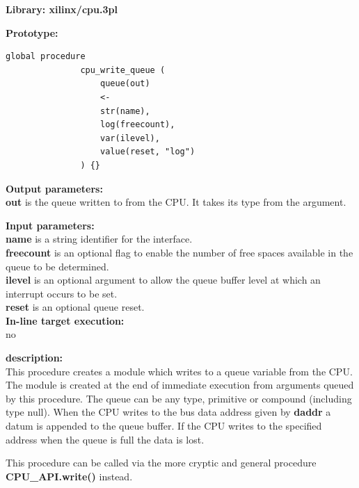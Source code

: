             {\bf Library: xilinx/cpu.3pl}

            {\bf Prototype:} \\
            \vsp
            \begin{lstlisting}[gobble=12, language=threepl]
               global procedure
               cpu_write_queue (
                   queue(out)
                   <-
                   str(name),
                   log(freecount),
                   var(ilevel),
                   value(reset, "log")
               ) {}
            \end{lstlisting}

            {\bf Output parameters:} \\
            {\bf out} is the queue written to from the CPU. It takes its type
            from the argument.

            {\bf Input parameters:} \\            
            {\bf name} is a string identifier for the interface.\\
            {\bf freecount} is an optional flag to enable the number of free spaces
            available in the queue to be determined.\\
            {\bf ilevel} is an optional argument to allow the queue buffer level
            at which an interrupt occurs to be set.\\
            {\bf reset} is an optional queue reset.\\
        
            {\bf In-line target execution:} \\
            no

            {\bf description:} \\
            This procedure creates a module which writes to a queue variable from
            the CPU. The module is created at the end of immediate execution from
            arguments queued by this procedure. The queue can be any type, primitive
            or compound (including type null). When the CPU writes to the bus data
            address given by {\bf daddr} a datum is appended to the queue buffer. If
            the CPU writes to the specified address when the queue is full the data
            is lost.
            
            This procedure can be called via the more cryptic and general
            procedure {\bf CPU\_API.write()}  instead.
            
            
            
